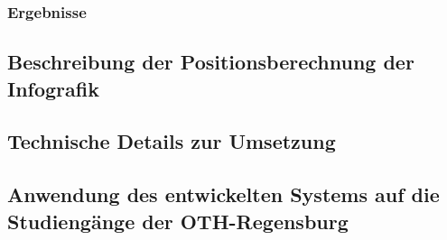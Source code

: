 \subsubsection{Ergebnisse}

\subsection{Beschreibung der Positionsberechnung der Infografik}

\subsection{Technische Details zur Umsetzung}

\subsection{Anwendung des entwickelten Systems auf die Studiengänge der OTH-Regensburg}